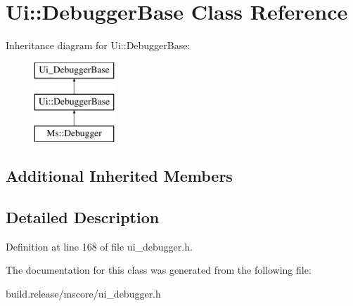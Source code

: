 \hypertarget{class_ui_1_1_debugger_base}{}\section{Ui\+:\+:Debugger\+Base Class Reference}
\label{class_ui_1_1_debugger_base}
Inheritance diagram for Ui\+:\+:Debugger\+Base\+:\begin{figure}[H]
\begin{center}
\leavevmode
\includegraphics[height=3.000000cm]{class_ui_1_1_debugger_base}
\end{center}
\end{figure}
\subsection*{Additional Inherited Members}


\subsection{Detailed Description}


Definition at line 168 of file ui\+\_\+debugger.\+h.



The documentation for this class was generated from the following file\+:\begin{DoxyCompactItemize}
\item 
build.\+release/mscore/ui\+\_\+debugger.\+h\end{DoxyCompactItemize}
